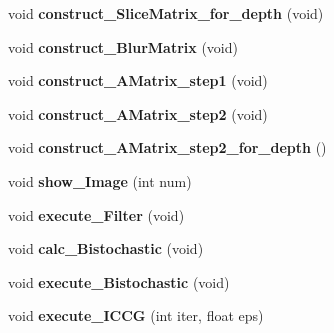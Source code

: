 \begin{DoxyCompactItemize}
\item 
void {\bfseries construct\+\_\+\+Slice\+Matrix\+\_\+for\+\_\+depth} (void)\hypertarget{classBilateralGrid_a4580d6b5b09695abeed154e444199da6}{}\label{classBilateralGrid_a4580d6b5b09695abeed154e444199da6}

\item 
void {\bfseries construct\+\_\+\+Blur\+Matrix} (void)\hypertarget{classBilateralGrid_acfed5846fa5f065305cfeede437c6821}{}\label{classBilateralGrid_acfed5846fa5f065305cfeede437c6821}

\item 
void {\bfseries construct\+\_\+\+A\+Matrix\+\_\+step1} (void)\hypertarget{classBilateralGrid_aabcfb752e903cb30efa74777e9909ff1}{}\label{classBilateralGrid_aabcfb752e903cb30efa74777e9909ff1}

\item 
void {\bfseries construct\+\_\+\+A\+Matrix\+\_\+step2} (void)\hypertarget{classBilateralGrid_a4f07fcdfa8cbe46c7b11fd00a124d7ef}{}\label{classBilateralGrid_a4f07fcdfa8cbe46c7b11fd00a124d7ef}

\item 
void {\bfseries construct\+\_\+\+A\+Matrix\+\_\+step2\+\_\+for\+\_\+depth} ()\hypertarget{classBilateralGrid_aae40be0d1c4edb17db1079bb1612128a}{}\label{classBilateralGrid_aae40be0d1c4edb17db1079bb1612128a}

\item 
void {\bfseries show\+\_\+\+Image} (int num)\hypertarget{classBilateralGrid_a04c894dbca4da5b7a5092b33f9c79b92}{}\label{classBilateralGrid_a04c894dbca4da5b7a5092b33f9c79b92}

\item 
void {\bfseries execute\+\_\+\+Filter} (void)\hypertarget{classBilateralGrid_a2fa58bb40362b25f47073aba74a5ef2f}{}\label{classBilateralGrid_a2fa58bb40362b25f47073aba74a5ef2f}

\item 
void {\bfseries calc\+\_\+\+Bistochastic} (void)\hypertarget{classBilateralGrid_ab873f086735b472feef706f6d9148d46}{}\label{classBilateralGrid_ab873f086735b472feef706f6d9148d46}

\item 
void {\bfseries execute\+\_\+\+Bistochastic} (void)\hypertarget{classBilateralGrid_aff60989adce9c1997a2dc070c0aafce5}{}\label{classBilateralGrid_aff60989adce9c1997a2dc070c0aafce5}

\item 
void {\bfseries execute\+\_\+\+I\+C\+CG} (int iter, float eps)\hypertarget{classBilateralGrid_a701074fe8ec52700a9dfc5dabe030b91}{}\label{classBilateralGrid_a701074fe8ec52700a9dfc5dabe030b91}


\end{DoxyCompactItemize}
